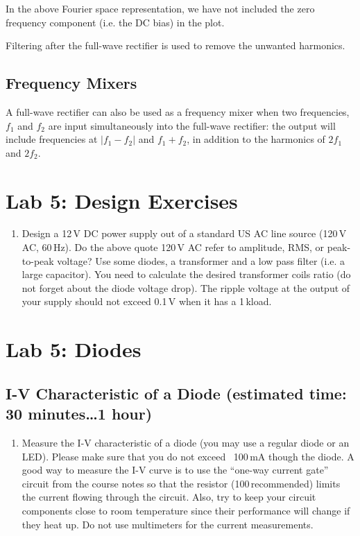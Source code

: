 \documentclass{article}
\begin{document}
In the above Fourier space representation, we have not included the zero frequency component (i.e. the DC bias) in the plot.

Filtering after the full-wave rectifier is used to remove the unwanted harmonics.

\subsection{Frequency Mixers}
A full-wave rectifier can also be used as a frequency mixer when two frequencies, $f_1$ and $f_2$ are input simultaneously into the full-wave rectifier: the output will include frequencies at $|f_1-f_2|$ and $f_1+f_2$, in addition to the harmonics of $2f_1$ and $2f_2$.


\pagebreak

\section{Lab 5: Design Exercises}
\begin{enumerate}
\item Design a 12\,V DC power supply out of a standard US AC line source (120\,V AC, 60\,Hz).  Do the above quote 120\,V AC refer to amplitude, RMS, or peak-to-peak voltage? Use some diodes, a transformer and a low pass filter (i.e. a large capacitor). You need to calculate the desired transformer coils ratio (do not forget about the diode voltage drop). The ripple voltage at the output of your supply should not exceed 0.1\,V when it has a 1\,k\Ohm load. 
\end{enumerate}

\section{Lab 5: Diodes}

\subsection{I-V Characteristic of a Diode (estimated time: 30 minutes\ldots 1 hour)}
\begin{enumerate}
\item Measure the I-V characteristic of a diode (you may use a regular diode or an LED). Please make sure that you do not exceed ~100\,mA though the diode. A good way to measure the I-V curve is to use the ``one-way current gate'' circuit from the course notes so that the resistor (100\,\Ohm recommended) limits the current flowing through the circuit. Also, try to keep your circuit components close to room temperature since their performance will change if they heat up. Do not use multimeters for the current measurements.
\end{enumerate}
\end{document}
